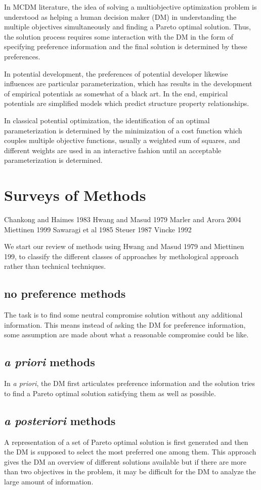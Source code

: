 In MCDM literature, the idea of solving a multiobjective optimization problem is understood as helping a human decision maker (DM) in understanding the multiple objectives simultaneously and finding a Pareto optimal solution.  Thus, the solution process requires some interaction with the DM in the form of specifying preference information and the final solution is determined by these preferences.

In potential development, the preferences of potential developer likewise influences are particular parameterization, which has results in the development of empirical potentials as somewhat of a black art.  In the end, empirical potentials are simplified models which predict structure property relationships.

In classical potential optimization, the identification of an optimal parameterization is determined by the minimization of a cost function which couples multiple objective functions, usually a weighted sum of squares, and different weights are used in an interactive fashion until an acceptable parameterization is determined.
\section{Surveys of Methods}
Chankong and Haimes 1983
Hwang and Masud 1979
Marler and Arora 2004
Miettinen 1999
Sawaragi et al 1985
Steuer 1987
Vincke 1992

We start our review of methods using Hwang and Masud 1979 and Miettinen 199, to classify the different classes of approaches by methological approach rather than technical techniques.
\subsection{no preference methods}
The task is to find some neutral compromise solution without any additional information.  This means instead of asking the DM for preference information, some assumption are made about what a reasonable compromise could be like.
\subsection{\emph{a priori} methods}
In \emph{a priori}, the DM first articulates preference information and the solution tries to find a Pareto optimal solution satisfying them as well as possible.

\subsection{\emph{a posteriori} methods}
A representation of a set of Pareto optimal solution is first generated and then the DM is supposed to select the most preferred one among them.  This approach gives the DM an overview of different solutions available but if there are more than two objectives in the problem, it may be difficult for the DM to analyze the large amount of information.

